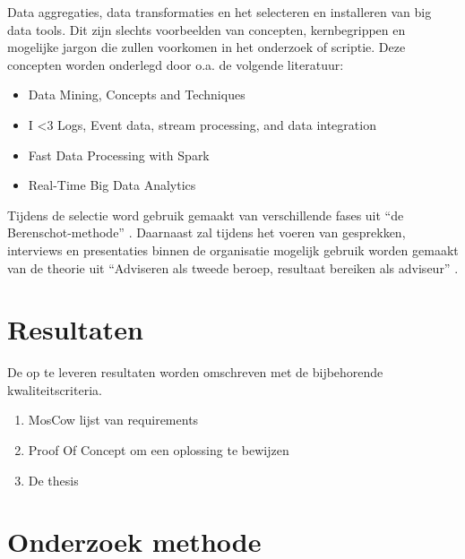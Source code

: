Data aggregaties, data transformaties en het selecteren en installeren van big data tools. Dit zijn slechts voorbeelden van concepten, kernbegrippen en mogelijke jargon die zullen voorkomen in het onderzoek of scriptie. Deze concepten worden onderlegd door o.a. de volgende literatuur:

\begin{itemize}
    \item Data Mining, Concepts and Techniques \parencite{data-mining}
    \item I <3 Logs, Event data, stream processing, and data integration \parencite{logs}
    \item Fast Data Processing with Spark \parencite{spark}
    \item Real-Time Big Data Analytics \parencite{realtime-architectures}
\end{itemize}

Tijdens de selectie word gebruik gemaakt van verschillende fases uit “de Berenschot-methode” \parencite{cuppen}.
Daarnaast zal tijdens het voeren van gesprekken, interviews en presentaties binnen de organisatie mogelijk gebruik worden gemaakt van de theorie uit “Adviseren als tweede beroep, resultaat bereiken als adviseur” \parencite{adviseren}.

\section{Resultaten} %

De op te leveren resultaten worden omschreven met de bijbehorende kwaliteitscriteria. 
\begin{enumerate}

    \item MosCow lijst van requirements
    \item Proof Of Concept om een oplossing te bewijzen
    \item De thesis
\end{enumerate}


\section{Onderzoek methode} %



